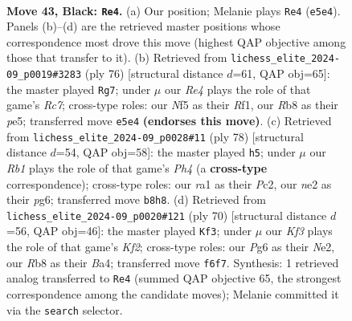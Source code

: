 \documentclass[11pt]{article}
\begin{document}
\clearpage

\begin{figure}[p]\centering
\begin{subfigure}{0.46\textwidth}\centering
\resizebox{\linewidth}{!}{%
\newchessgame
\chessboard[
  setfen={1r6/8/R2p1kp1/4rn1p/1p5P/8/4NpP1/R4K2 b - - 0 43},
  showmover=false,
  pgfstyle=straightmove, color=movearrow, markmove={e5-e4}
]}
\caption{}
\end{subfigure}\hfill
\begin{subfigure}{0.46\textwidth}\centering
\resizebox{\linewidth}{!}{%
\newchessgame
\chessboard[
  setfen={k4r2/P1R5/1pp2r2/1p2p3/6p1/2P3P1/1P2KP2/5R2 w - - 4 39},
  showmover=false,
  pgfstyle=straightmove, color=movearrow, markmove={c7-g7}
]}
\caption{}
\end{subfigure}
\\[4pt]
\begin{subfigure}{0.46\textwidth}\centering
\resizebox{\linewidth}{!}{%
\newchessgame
\chessboard[
  setfen={1r2r3/8/p5p1/P7/2R1pkPP/1P6/1KP5/4R3 w - - 1 40},
  showmover=false,
  pgfstyle=straightmove, color=movearrow, markmove={h4-h5}
]}
\caption{}
\end{subfigure}\hfill
\begin{subfigure}{0.46\textwidth}\centering
\resizebox{\linewidth}{!}{%
\newchessgame
\chessboard[
  setfen={b7/2p2rkp/2P1p3/1P2P2R/Bb3P2/8/4NK2/8 w - - 3 36},
  showmover=false,
  pgfstyle=straightmove, color=movearrow, markmove={f2-f3}
]}
\caption{}
\end{subfigure}
\caption{\textbf{Move 43, Black: \texttt{Re4}.} (a) Our position; Melanie plays \texttt{Re4} (\texttt{e5e4}). Panels (b)--(d) are the retrieved master positions whose correspondence most drove this move (highest QAP objective among those that transfer to it). (b) Retrieved from \texttt{lichess\_elite\_2024-09\_p0019\#3283} (ply 76) [structural distance $d$=61, QAP obj=65]: the master played \texttt{Rg7}; under $\mu$ our \emph{Re4} plays the role of that game's \emph{Rc7}; cross-type roles: our \emph{N}f5 as their \emph{R}f1, our \emph{R}b8 as their \emph{p}e5; transferred move \texttt{e5e4} \textbf{(endorses this move)}. (c) Retrieved from \texttt{lichess\_elite\_2024-09\_p0028\#11} (ply 78) [structural distance $d$=54, QAP obj=58]: the master played \texttt{h5}; under $\mu$ our \emph{Rb1} plays the role of that game's \emph{Ph4} (a \textbf{cross-type} correspondence); cross-type roles: our \emph{r}a1 as their \emph{P}c2, our \emph{n}e2 as their \emph{p}g6; transferred move \texttt{b8h8}. (d) Retrieved from \texttt{lichess\_elite\_2024-09\_p0020\#121} (ply 70) [structural distance $d$=56, QAP obj=46]: the master played \texttt{Kf3}; under $\mu$ our \emph{Kf3} plays the role of that game's \emph{Kf2}; cross-type roles: our \emph{P}g6 as their \emph{N}e2, our \emph{R}b8 as their \emph{B}a4; transferred move \texttt{f6f7}. Synthesis: 1 retrieved analog transferred to \texttt{Re4} (summed QAP objective 65, the strongest correspondence among the candidate moves); Melanie committed it via the \texttt{search} selector.}
\label{fig:thought-m85}
\end{figure}
\end{document}
